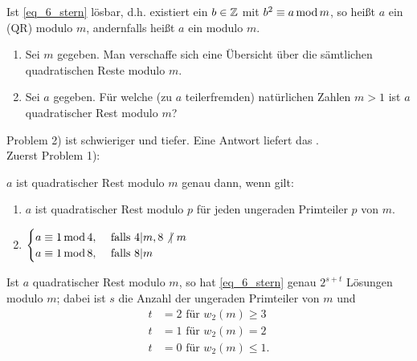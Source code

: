 \begin{defn}
	Ist \eqref{eq_6_stern} lösbar, d.h. existiert ein $b \in \mathbb{Z}$ mit $b^2 \equiv a  \operatorname{mod} m$, so heißt $a$ ein  (QR) modulo $m$, andernfalls heißt $a$ ein  modulo $m$.
\end{defn}

	\begin{enumerate}[1)]
		\item Sei $m$ gegeben. Man verschaffe sich eine Übersicht über die sämtlichen quadratischen Reste modulo $m$.
		\item Sei $a$ gegeben. Für welche (zu $a$ teilerfremden) natürlichen Zahlen $m > 1$ ist $a$ quadratischer Rest modulo $m$?
	\end{enumerate}

Problem 2) ist schwieriger und tiefer. Eine Antwort liefert das .\\ Zuerst Problem 1): 

\begin{falko} \label{F6.2}
	$a$ ist quadratischer Rest modulo $m$ genau dann, wenn gilt:
	\begin{enumerate}[1)]
		\item $a$ ist quadratischer Rest modulo $p$ für jeden ungeraden Primteiler $p$ von $m$.
		\item $\begin{cases}
			a \equiv 1 \operatorname{mod} 4, & \text{ falls } 4 | m, 8 \not| \ m \\
			a \equiv 1 \operatorname{mod} 8, & \text{ falls } 8 | m
		\end{cases}$
	\end{enumerate}
	Ist $a$ quadratischer Rest modulo $m$, so hat \eqref{eq_6_stern} genau $2^{s+t}$ Lösungen modulo $m$; dabei ist $s$ die Anzahl der ungeraden Primteiler von $m$ und
	\begin{equation}
	\begin{aligned}
		t &= 2 \text{ für } w_2(m) \geq 3 \\
		t &= 1 \text{ für } w_2(m) = 2 \\
		t &= 0 \text{ für } w_2(m) \leq 1.
	\end{aligned}
	\end{equation}
\end{falko}